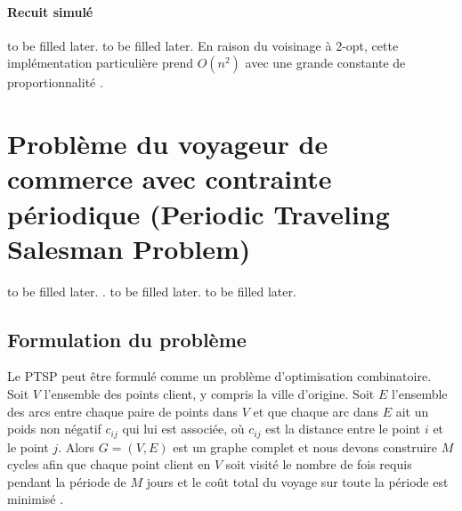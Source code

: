\medskip

\paragraph{Recuit simulé}to be filled later. \parencite{johnson_traveling_1995} to be filled later. En raison du voisinage à 2-opt, cette implémentation particulière prend $O(n^2)$ avec une grande constante de proportionnalité \parencite{davendra_traveling_2010}.

\medskip

\section{Problème du voyageur de commerce avec contrainte périodique (Periodic Traveling Salesman Problem)}
\label{sec:ptsp}to be filled later. \parencite{paletta_period_2002}. to be filled later. \parencite{cordeau_tabu_1997}to be filled later.

\medskip

\subsection{Formulation du problème}
Le PTSP peut être formulé comme un problème d'optimisation combinatoire. Soit $V$ l'ensemble des points client, y compris la ville d'origine. Soit $E$ l'ensemble des arcs entre chaque paire de points dans $V$ et que chaque arc dans $E$ ait un poids non négatif $c_{ij}$ qui lui est associée, où $c_{ij}$ est la distance entre le point $i$ et le point $j$. Alors $G = (V, E)$ est un graphe complet et nous devons construire $M$ cycles afin que chaque point client en $V$ soit visité le nombre de fois requis pendant la période de $M$ jours et le coût total du voyage sur toute la période est minimisé \parencite{chao_new_1995}.


